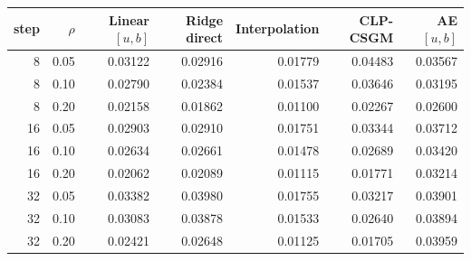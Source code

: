 \begin{tabular}{rrrrrrr}
\toprule
step & $\rho$ & Linear $[u,b]$ & Ridge direct & Interpolation & CLP-CSGM & AE $[u,b]$ \\
\midrule
8 & 0.05 & 0.03122 & 0.02916 & 0.01779 & 0.04483 & 0.03567 \\
8 & 0.10 & 0.02790 & 0.02384 & 0.01537 & 0.03646 & 0.03195 \\
8 & 0.20 & 0.02158 & 0.01862 & 0.01100 & 0.02267 & 0.02600 \\
16 & 0.05 & 0.02903 & 0.02910 & 0.01751 & 0.03344 & 0.03712 \\
16 & 0.10 & 0.02634 & 0.02661 & 0.01478 & 0.02689 & 0.03420 \\
16 & 0.20 & 0.02062 & 0.02089 & 0.01115 & 0.01771 & 0.03214 \\
32 & 0.05 & 0.03382 & 0.03980 & 0.01755 & 0.03217 & 0.03901 \\
32 & 0.10 & 0.03083 & 0.03878 & 0.01533 & 0.02640 & 0.03894 \\
32 & 0.20 & 0.02421 & 0.02648 & 0.01125 & 0.01705 & 0.03959 \\
\bottomrule
\end{tabular}
